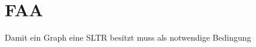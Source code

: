 \section{FAA}

Damit ein Graph eine SLTR besitzt muss als notwendige Bedingung 
\begin{definition}
\end{definition}